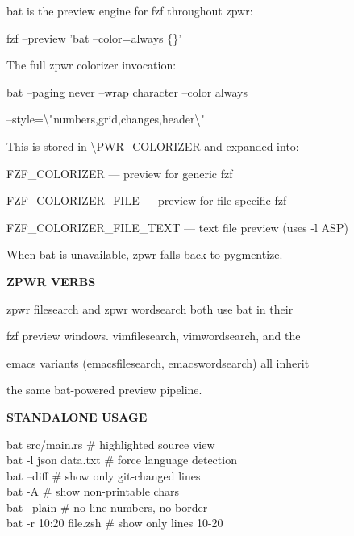 \documentclass[11pt,a4paper,twoside]{book}
\begin{document}
bat is the preview engine for fzf throughout zpwr:

\begin{codebox}
fzf --preview 'bat --color=always \{\}'\\
\end{codebox}

The full zpwr colorizer invocation:

\begin{codebox}
bat --paging never --wrap character --color always\\
\end{codebox}

--style=\textbackslash{}"numbers,grid,changes,header\textbackslash{}"

This is stored in \textbackslash{}PWR\_COLORIZER and expanded into:

FZF\_COLORIZER          — preview for generic fzf

FZF\_COLORIZER\_FILE     — preview for file-specific fzf

FZF\_COLORIZER\_FILE\_TEXT — text file preview (uses -l ASP)

When bat is unavailable, zpwr falls back to pygmentize.


\vspace{12pt}
{\bfseries\color{neonyellow} ZPWR VERBS}\vspace{4pt}

zpwr filesearch and zpwr wordsearch both use bat in their

fzf preview windows. vimfilesearch, vimwordsearch, and the

emacs variants (emacsfilesearch, emacswordsearch) all inherit

the same bat-powered preview pipeline.


\vspace{12pt}
{\bfseries\color{neonyellow} STANDALONE USAGE}\vspace{4pt}

\begin{codebox}
bat src/main.rs              \# highlighted source view\\
bat -l json data.txt         \# force language detection\\
bat --diff                    \# show only git-changed lines\\
bat -A                        \# show non-printable chars\\
bat --plain                   \# no line numbers, no border\\
bat -r 10:20 file.zsh        \# show only lines 10-20\\
\end{codebox}
\end{document}
